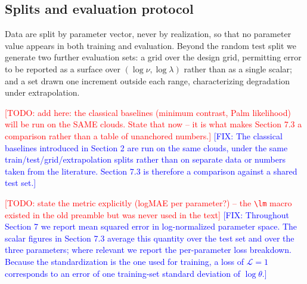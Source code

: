 \documentclass[11pt,letterpaper]{article}
\newcommand{\1}{\mathds{1}}
\newcommand{\todo}[1]{\textcolor{red}{[TODO: #1]}}
\newcommand{\fix}[1]{\textcolor{blue}{[FIX: #1]}}
\newcommand{\todo}[1]{}
\newcommand{\fix}[1]{}
\theoremstyle{plain}
\theoremstyle{definitioncolon}
\begin{document}
\subsection{Splits and evaluation protocol}
Data are split by parameter vector, never by realization, so that no parameter
value appears in both training and evaluation. Beyond the random test split we
generate two further evaluation sets: a grid over the design grid, permitting
error to be reported as a surface over $(\log\nu, \log\lambda)$ rather than as a
single scalar; and a set drawn one increment outside each range, characterizing
degradation under extrapolation.

\todo{add here: the classical baselines (minimum contrast, Palm likelihood) will
be run on the SAME clouds. State that now -- it is what makes Section 7.3 a
comparison rather than a table of unanchored numbers.}
\fix{The classical baselines introduced in Section 2 are run on the same clouds,
under the same train/test/grid/extrapolation splits rather than on separate data
or numbers taken from the literature. Section 7.3 is therefore a comparison
against a shared  test set.}

\todo{state the metric explicitly (logMAE per parameter?) -- the \texttt{\textbackslash lm}
macro existed in the old preamble but was never used in the text}
\fix{Throughout Section 7 we report mean squared error in log-normalized parameter
space. The scalar figures in Section 7.3 average this quantity over the test
set and over the three parameters; where relevant we report the per-parameter
loss breakdown. Because the standardization is the one used for training, 
a loss of $\mathcal{L}=1$ corresponds to an error of one training-set standard 
deviation of $\log\theta$.}



%
\end{document}

